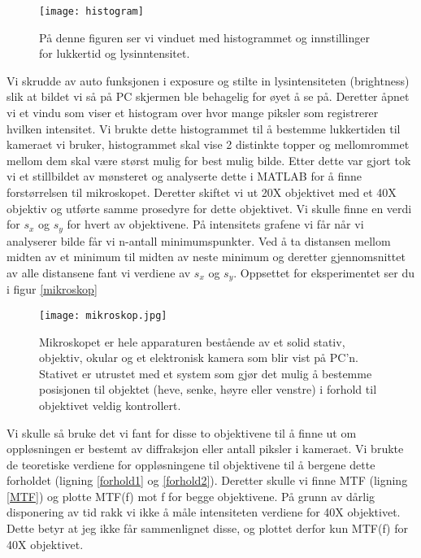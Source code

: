 \documentclass[norsk,a4paper,12pt]{article}
\begin{document}
\begin{figure}
	\begin{center}
  	\texttt{[image: histogram]}\\
	\caption[Histogram for justering av lukkertiden til kameraet]{På denne figuren ser vi vinduet med histogrammet og innstillinger for lukkertid og lysinntensitet.}
	\label{histo}
	\end{center}
\end{figure}


Vi skrudde av auto funksjonen i exposure og stilte in lysintensiteten (brightness) slik at bildet vi så på PC skjermen ble behagelig for øyet å se på. Deretter åpnet vi et vindu som viser et histogram over hvor mange piksler som registrerer hvilken intensitet. Vi brukte dette histogrammet til å bestemme lukkertiden til kameraet vi bruker, histogrammet skal vise 2 distinkte topper og mellomrommet mellom dem skal være størst mulig for best mulig bilde.  
Etter dette var gjort tok vi et stillbildet av mønsteret og analyserte dette i MATLAB for å finne forstørrelsen til mikroskopet. Deretter skiftet vi ut 20X objektivet med et 40X objektiv og utførte samme prosedyre for dette objektivet. Vi skulle finne en verdi for $s_x$ og $s_y$ for hvert av objektivene. På intensitets grafene vi får når vi analyserer bilde får vi n-antall minimumspunkter. Ved å ta distansen mellom midten av et minimum til midten av neste minimum og deretter gjennomsnittet av alle distansene fant vi verdiene av $s_x$ og $s_y$. Oppsettet for eksperimentet ser du i figur \vref{mikroskop}

\begin{figure}
	\begin{center}
  	\texttt{[image: mikroskop.jpg]}\\
	\caption[Mikroskop]{Mikroskopet er hele apparaturen bestående av et solid stativ, objektiv, okular og et elektronisk kamera som blir vist på PC'n. Stativet er utrustet med et system som gjør det mulig å bestemme posisjonen til objektet (heve, senke, høyre eller venstre) i forhold til objektivet veldig kontrollert.}
	\label{mikroskop}
	\end{center}
\end{figure}


Vi skulle så bruke det vi fant for disse to objektivene til å finne ut om oppløsningen er bestemt av diffraksjon eller antall piksler i kameraet. Vi brukte de teoretiske verdiene for oppløsningene til objektivene til å bergene dette forholdet (ligning \ref{forhold1} og \vref{forhold2}). Deretter skulle vi finne MTF (ligning \vref{MTF}) og plotte MTF(f) mot f for begge objektivene. På grunn av dårlig disponering av tid rakk vi ikke å måle intensiteten verdiene for 40X objektivet. Dette betyr at jeg ikke får sammenlignet disse, og plottet derfor kun MTF(f) for 40X objektivet.
\end{document}
